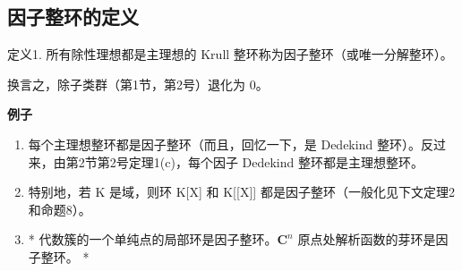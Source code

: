 \subsection{因子整环的定义}

定义1. 所有除性理想都是主理想的 Krull 整环称为因子整环（或唯一分解整环）。

换言之，除子类群（第1节，第2号）退化为 0。

\textbf{例子}\par

\begin{enumerate}
\def\labelenumi{(\arabic{enumi})}
\item
  每个主理想整环都是因子整环（而且，回忆一下，是 Dedekind 整环）。反过来，由第2节第2号定理1(c)，每个因子 Dedekind 整环都是主理想整环。
\item
  特别地，若 K 是域，则环 K{[}X{]} 和 K{[}{[}X{]}{]} 都是因子整环（一般化见下文定理2和命题8）。
\item
  * 代数簇的一个单纯点的局部环是因子整环。\(\mathbf{C}^n\) 原点处解析函数的芽环是因子整环。 *
\end{enumerate}

